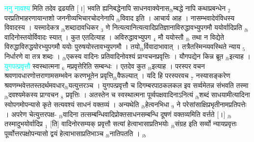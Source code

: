 \documentclass[article,12pt,a4paper]{memoir}%
\newcommand{\quotelemma}[1]{\textcolor{cyan}{#1}}
\newcounter{parCount}
\begin{document}
	  
	  \pstart \leavevmode%
	\hphantom{.}\quotelemma{ननु नावश्य} मिति तदेव द्रढयति [।] भवति ह्यनिबद्धेनापि साधनवाक्येनास{\tiny $_{lb}$}म्बद्धे नापि कथाप्रबन्धेन {\tiny $_{2}$} परप्रतिभाहरणायान्तशो जननीव्यभिचारचोदनेनापि {\tiny $_{lb}$}विवाद इति । आचार्य आह । नासम्भवादेवंविधस्य विवादस्य । यस्मादेकत्र {\tiny $_{lb}$}शब्दादावधिकर {\tiny $_{3}$} णे नित्यत्वानित्यत्वादिप्रतिज्ञानाविरुद्धावभ्युपगमौ ययोर्वादिप्रति {\tiny $_{lb}$}वादिनोस्तयोर्विवादः स्यात् । कुत एतदित्याह । अविरुद्धावभ्युपग {\tiny $_{4}$} मौ ययोस्तौ {\tiny $_{lb}$} \leavevmode{} तथा न विद्येते विरुद्धाविरुद्धयोरभ्युपगमौ ययोः पुरुषयोस्तावभ्युपगमौ । तयो{\tiny $_{lb}$}र्विवादाभावात् । तत्रैतस्मिन्व्यवस्थिते न्याय {\tiny $_{5}$} निर्धारणे वा तत्र शब्दः । {\tiny $_{lb}$}एकस्य वादिनः प्रतिवादिनोवश्यं प्राग्वचनप्रवृत्तिः । यौगपद्येन किन्न ब्रूत {\tiny $_{lb}$}इत्याह । \quotelemma{युगपत्प्रवृत्तौ} स्वस्थात्मना {\tiny $_{6}$} मप्रवृत्तेरिति सम्बन्धः । एतदेव कुत {\tiny $_{lb}$}इत्याह । परस्पर वचन श्रवणावधारणोत्तराणामसम्भवेन करणभूतेन प्रवृत्ति{\tiny $_{lb}$}वैफल्यात् । यदि हि परस्परवच {\tiny $_{7}$} नस्यासङ्करेण श्रवणम्भवेत्ततस्तदर्थमवधार{\tiny $_{lb}$}यत्युत्तरञ्च । युगपत्प्रवृत्तौ च दिगम्बरपाठकलकल इव सर्व्वमेतन्न संभवति तस्मा{\tiny $_{lb}$}दवश्यमेकस्य प्राग्वचन {\tiny $_{8}$} प्रवृत्तिः । अतस्तेन च स्वस्थात्मना पूर्व्वपक्षवादिनाऽनित्यं {\tiny $_{lb}$}शब्दं साधयामीत्यादिना स्वोपगमोपन्यासे कृते सत्यवश्यं साधनं वक्तव्यं । अन्यथेति {\tiny $_{lb}$}हेत्वनभिधा {\tiny $_{9}$} \leavevmode{} ने परेसांसाक्षिप्रभृतीनामप्रतिपत्तेः । अपरेण चेत्युत्तरपक्ष- {\tiny $_{lb}$}वादिना तत्सम्बन्धिवादिप्रोक्तसाधनसम्बन्धि दूषणं वक्तव्यमिति वर्त्तते [।] {\tiny $_{lb}$}तस्मादुभयोर्वादिप्र {\tiny $_{1}$} [ति] वादिनोरसम्यक् प्रवृत्तौ सत्यां हेत्वाभासाप्रतिभयोः {\tiny $_{lb}$}संग्रह इति सर्व्वो न्यायप्रवृत्तः पूर्व्वोत्तरपक्षोपन्यासो द्वयं हेत्वाभासाप्रतिभाञ्च {\tiny $_{lb}$}नातिपतति ।
	{}
	\pend%
      {\tiny $_{lb}$}
\end{document}
